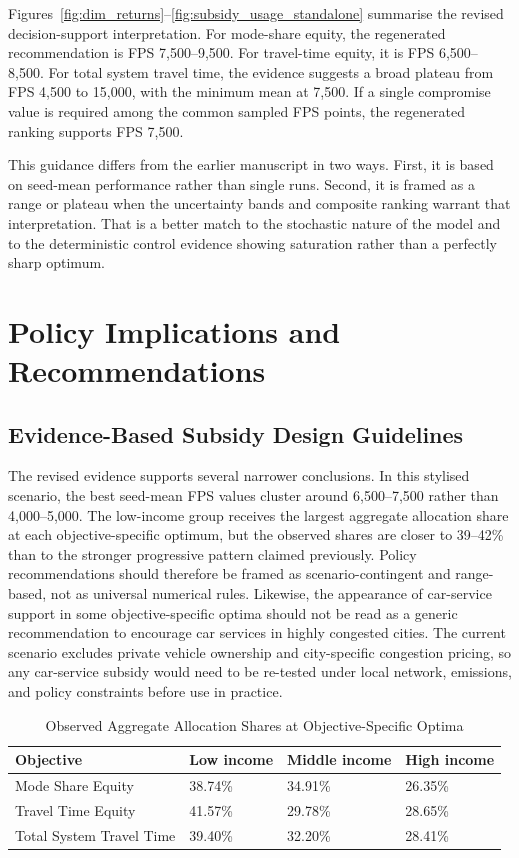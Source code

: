 \documentclass[a4paper,fleqn]{cas-sc}
\begin{document}
Figures~\ref{fig:dim_returns}--\ref{fig:subsidy_usage_standalone} summarise the revised decision-support interpretation. For mode-share equity, the regenerated recommendation is FPS 7,500--9,500. For travel-time equity, it is FPS 6,500--8,500. For total system travel time, the evidence suggests a broad plateau from FPS 4,500 to 15,000, with the minimum mean at 7,500. If a single compromise value is required among the common sampled FPS points, the regenerated ranking supports FPS 7,500.

This guidance differs from the earlier manuscript in two ways. First, it is based on seed-mean performance rather than single runs. Second, it is framed as a range or plateau when the uncertainty bands and composite ranking warrant that interpretation. That is a better match to the stochastic nature of the model and to the deterministic control evidence showing saturation rather than a perfectly sharp optimum.

\section{Policy Implications and Recommendations}\label{sec:implications}

\subsection{Evidence-Based Subsidy Design Guidelines}
The revised evidence supports several narrower conclusions. In this stylised scenario, the best seed-mean FPS values cluster around 6,500--7,500 rather than 4,000--5,000. The low-income group receives the largest aggregate allocation share at each objective-specific optimum, but the observed shares are closer to 39--42\% than to the stronger progressive pattern claimed previously. Policy recommendations should therefore be framed as scenario-contingent and range-based, not as universal numerical rules. Likewise, the appearance of car-service support in some objective-specific optima should not be read as a generic recommendation to encourage car services in highly congested cities. The current scenario excludes private vehicle ownership and city-specific congestion pricing, so any car-service subsidy would need to be re-tested under local network, emissions, and policy constraints before use in practice.

\begin{table}[H]
\centering
\caption{Observed Aggregate Allocation Shares at Objective-Specific Optima}
\label{tab:progressive_structure}
\begin{tabular}{p{3.2cm}p{3cm}p{3cm}p{3cm}}
\toprule
\textbf{Objective} & \textbf{Low income} & \textbf{Middle income} & \textbf{High income} \\
\midrule
Mode Share Equity & 38.74\% & 34.91\% & 26.35\% \\
\midrule
Travel Time Equity & 41.57\% & 29.78\% & 28.65\% \\
\midrule
Total System Travel Time & 39.40\% & 32.20\% & 28.41\% \\
\bottomrule
\end{tabular}
\end{table}
\end{document}

